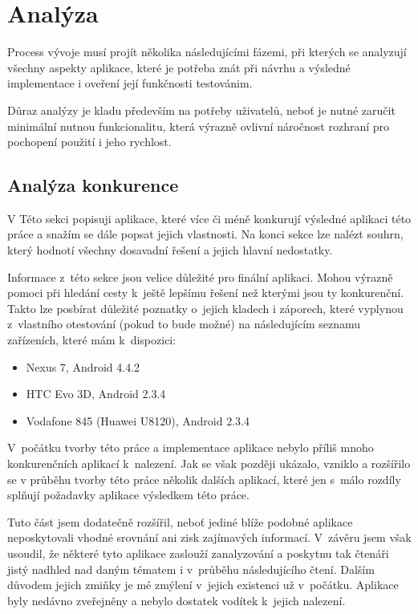 \documentclass[thesis=B,czech]{FITthesis}[2013/10/20]
\begin{document}
\chapter{Analýza}

Process vývoje musí projít několika následujícími fázemi, při kterých se analyzují všechny aspekty aplikace, které je potřeba znát při návrhu a výsledné implementace i oveření její funkčnosti testovánim. 

Důraz analýzy je kladu především na potřeby uživatelů, neboť je nutné zaručit minimální nutnou funkcionalitu, která výrazně ovlivní náročnost rozhraní pro pochopení použití i jeho rychlost.

\section{Analýza konkurence}

V Této sekci popisuji aplikace, které více či méně konkurují výsledné aplikaci této práce a snažím se dále popsat jejich vlastnosti. Na konci sekce lze nalézt souhrn, který hodnotí všechny dosavadní řešení a jejich hlavní nedostatky.

Informace z~této sekce jsou velice důležité pro finální aplikaci. Mohou výrazně pomoci při hledání cesty k~ještě lepšímu řešení než kterými jsou ty konkurenční. Takto lze posbírat důležité poznatky o~jejich kladech i záporech, které vyplynou z~vlastního otestování (pokud to bude možné) na následujícím seznamu zařízeních, které mám k~dispozici:
\begin{itemize}
  \item{Nexus 7, Android 4.4.2}
  \item{HTC Evo 3D, Android 2.3.4}
  \item{Vodafone 845 (Huawei U8120), Android 2.3.4}
\end{itemize}

V~počátku tvorby této práce a implementace aplikace nebylo příliš mnoho konkurenčních aplikací k~nalezení. Jak se však později ukázalo, vzniklo a rozšířilo se v průběhu tvorby této práce několik dalších aplikací, které jen s~málo rozdíly splňují požadavky aplikace výsledkem této práce.

Tuto část jsem dodatečně rozšířil, neboť jediné blíže podobné aplikace neposkytovali vhodné srovnání ani zisk zajímavých informací. V~závěru jsem však usoudil, že některé tyto aplikace zaslouží zanalyzování a poskytnu tak čtenáři jistý nadhled nad daným tématem i v~průběhu následujícího čtení. Dalším důvodem jejich zmiňky je mé zmýlení v~jejich existenci už v~počátku. Aplikace byly nedávno zveřejněny a nebylo dostatek vodítek k~jejich nalezení.
\end{document}
